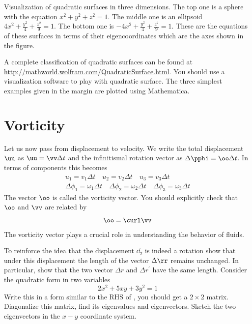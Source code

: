 \documentclass{tufte-book} %
\begin{document}
\begin{marginfigure}
 \caption{ Visualization of quadratic surfaces in three
   dimensions. The top one is a sphere with the equation
  $x^2+y^2+z^2=1$. The middle one is an ellipsoid 
  $4x^2+\frac{y^2}{4}+\frac{z^2}{9}=1$. The bottom one is
 $-4x^2+\frac{y^2}{4}+\frac{z^2}{9}=1$. These are the equations of
 these surfaces in terms of their eigencoordinates which are the axes
 shown in the figure. }
  \label{fig:qsurf}
\end{marginfigure}
%
A complete classification of quadratic surfaces can be found at 
\url{http://mathworld.wolfram.com/QuadraticSurface.html}. You should
use a visualization software  to play with quadratic
surface. The three simplest examples given in the margin are plotted
using Mathematica.
\section{Vorticity}
Let us now pass from displacement to velocity. We write the total
displacement $\uu$  as $\uu = \vv \Delta t$ and the infinitismal
rotation vector as $\Delta \pphi = \oo \Delta t$. In terms of
components this becomes 
\begin{subequations}
\begin{align}
u_1 = v_1 \Delta t \quad u_2 = v_2 \Delta t \quad u_3 = v_3 \Delta t
  \\
\Delta \phi_1 = \omega_1 \Delta t \quad \Delta \phi_2 =
  \omega_2 \Delta t\quad
  \Delta \phi_3 = \omega_3 \Delta t 
\end{align}
\end{subequations}
The vector $\oo$ is called the vorticity vector. You should
explicitly check that $\oo$ and  $\vv$ are related by  
\begin{equation}
\oo = \curl \vv
\end{equation}
The vorticity vector plays a crucial role in understanding the
behavior of fluids. 
\begin{Exercise}
\Question
To reinforce the idea that the displacement $\dd_2$ is indeed a
rotation show that under this displacement the length of the vector
$\Delta \rr$ remains unchanged. In particular, show that the two
vector $\Delta r$ and $\Delta r^{\prime}$ have the same length. 
\Question Consider the quadratic form in two variables
\begin{equation}
2x^2 + 5xy+ 3y^2 = 1
\end{equation}
Write this in a form similar to the RHS of , you
should get a $2\times 2$ matrix. Diagonalize this matrix, find its
eigenvalues and eigenvectors. Sketch the two eigenvectors in the $x-y$
coordinate system. 
\end{Exercise}
\end{document}
